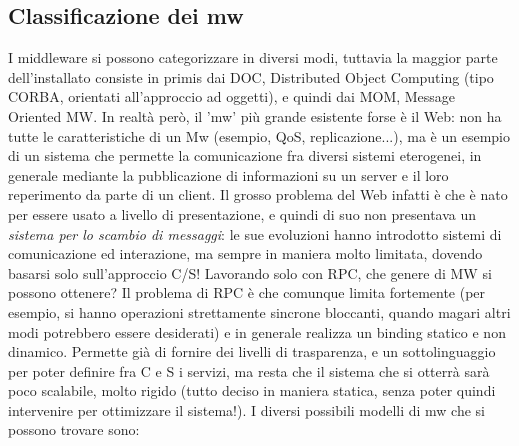 \subsection{Classificazione dei mw}
I middleware si possono categorizzare in diversi modi, tuttavia la maggior parte dell'installato consiste in primis 
dai DOC, Distributed Object Computing (tipo CORBA, orientati all'approccio ad oggetti), e quindi dai MOM, Message
Oriented MW. In realtà però, il 'mw' più grande esistente forse è il Web: non ha tutte le caratteristiche di un Mw
(esempio, QoS, replicazione...), ma è un esempio di un sistema che permette la comunicazione fra diversi sistemi
eterogenei, in generale mediante la pubblicazione di informazioni su un server e il loro reperimento da parte di un
client. Il grosso problema del Web infatti è che è nato per essere usato a livello di presentazione, e quindi di suo 
non presentava un \textit{sistema per lo scambio di messaggi}: le sue evoluzioni hanno introdotto sistemi di
comunicazione ed interazione, ma sempre in maniera molto limitata, dovendo basarsi solo sull'approccio C/S!
Lavorando solo con RPC, che genere di MW si possono ottenere? Il problema di RPC è che comunque limita fortemente 
(per esempio, si hanno operazioni strettamente sincrone bloccanti, quando magari altri modi potrebbero essere
desiderati) e in generale realizza un binding statico e non dinamico. Permette già di fornire dei livelli di
trasparenza, e un sottolinguaggio per poter definire fra C e S i servizi, ma resta che il sistema che si otterrà sarà
poco scalabile, molto rigido (tutto deciso in maniera statica, senza poter quindi intervenire per ottimizzare il
sistema!).
I diversi possibili modelli di mw che si possono trovare sono:
